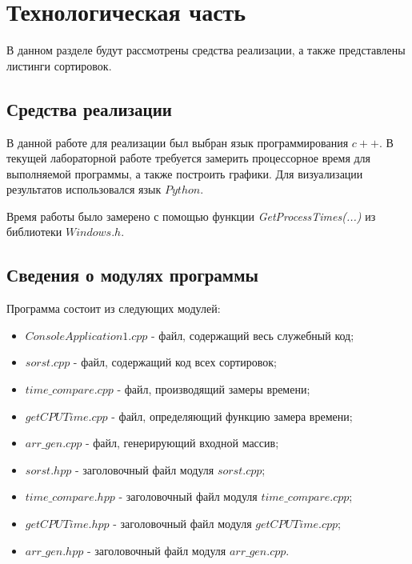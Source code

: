 \chapter{Технологическая часть}
В данном разделе будут рассмотрены средства реализации, а также представлены листинги сортировок.
\section{Средства реализации}
В данной работе для реализации был выбран язык программирования $c++$. В текущей лабораторной работе требуется замерить процессорное время для выполняемой программы, а также построить графики. Для визуализации результатов использовался язык $Python$.

Время работы было замерено с помощью функции \textit{GetProcessTimes(...)} \cite{time} из библиотеки $Windows.h$.

\section{Сведения о модулях программы}
Программа состоит из следующих модулей:
\begin{itemize}
	\item $ConsoleApplication1.cpp$ - файл, содержащий весь служебный код;
	\item $sorst.cpp$ - файл, содержащий код всех сортировок;
	\item $time\_compare.cpp$ - файл, производящий замеры времени;
	\item $getCPUTime.cpp$ - файл, определяющий функцию замера времени;
	\item $arr\_gen.cpp$ - файл, генерирующий входной массив;
	\item $sorst.hpp$ - заголовочный файл модуля $sorst.cpp$;
	\newpage
	\item $time\_compare.hpp$ - заголовочный файл модуля $time\_compare.cpp$;
	\item $getCPUTime.hpp$ - заголовочный файл модуля $getCPUTime.cpp$;
	\item $arr\_gen.hpp$ - заголовочный файл модуля $arr\_gen.cpp$.\newline
\end{itemize}

